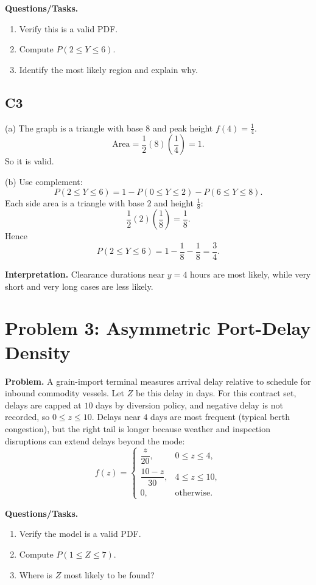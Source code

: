 \textbf{Questions/Tasks.}
\begin{enumerate}[label=(\alph*)]
\item Verify this is a valid PDF.
\item Compute $P(2\le Y\le 6)$.
\item Identify the most likely region and explain why.
\end{enumerate}

\subsection*{C3}
(a) The graph is a triangle with base $8$ and peak height $f(4)=\frac14$.
\[
\text{Area}=\frac12(8)\left(\frac14\right)=1.
\]
So it is valid.

(b) Use complement:
\[
P(2\le Y\le 6)=1-P(0\le Y\le 2)-P(6\le Y\le 8).
\]
Each side area is a triangle with base $2$ and height $\frac18$:
\[
\frac12(2)\left(\frac18\right)=\frac18.
\]
Hence
\[
P(2\le Y\le 6)=1-\frac18-\frac18=\frac34.
\]

\textbf{Interpretation.}
Clearance durations near $y=4$ hours are most likely, while very short and very long cases are less likely.

\section{Problem 3: Asymmetric Port-Delay Density}

\textbf{Problem.}
A grain-import terminal measures arrival delay relative to schedule for inbound commodity vessels. Let $Z$ be this delay in days. For this contract set, delays are capped at $10$ days by diversion policy, and negative delay is not recorded, so $0\le z\le 10$. Delays near $4$ days are most frequent (typical berth congestion), but the right tail is longer because weather and inspection disruptions can extend delays beyond the mode:
\[
f(z)=\begin{cases}
\dfrac{z}{20}, & 0\le z\le 4,\\
\dfrac{10-z}{30}, & 4\le z\le 10,\\
0, & \text{otherwise.}
\end{cases}
\]

\textbf{Questions/Tasks.}
\begin{enumerate}[label=(\alph*)]
\item Verify the model is a valid PDF.
\item Compute $P(1\le Z\le 7)$.
\item Where is $Z$ most likely to be found?
\end{enumerate}

